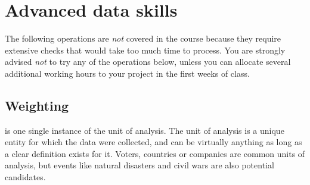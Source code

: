 %
%
\section{Advanced data skills}

The following operations are \emph{not} covered in the course because they require extensive checks that would take too much time to process. You are strongly advised \emph{not} to try any of the operations below, unless you can allocate several additional working hours to your project in the first weeks of class.

%
\subsection{Weighting}

 is one single instance of the unit of analysis. The unit of analysis is a unique entity for which the data were collected, and can be virtually anything as long as a clear definition exists for it. Voters, countries or companies are common units of analysis, but events like natural disasters and civil wars are also potential candidates.

